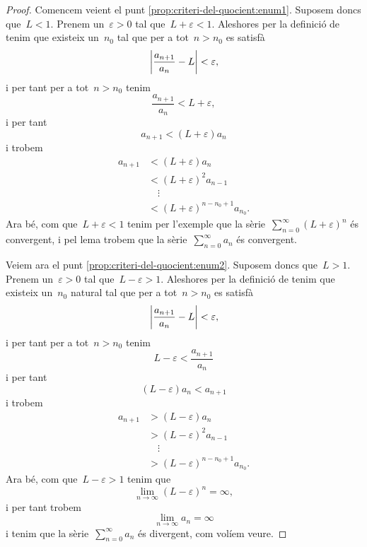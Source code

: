 \documentclass[../analisi-matematica.tex]{subfiles}
\begin{document}
    \begin{proof}
        Comencem veient el punt \eqref{prop:criteri-del-quocient:enum1}.
        Suposem doncs que~\(L<1\).
        Prenem un~\(\varepsilon>0\) tal que~\(L+\varepsilon<1\).
        Aleshores per la definició de  tenim que existeix un~\(n_{0}\) tal que per a tot~\(n>n_{0}\) es satisfà
        \[
            \abs{\frac{a_{n+1}}{a_{n}}-L}<\varepsilon,
        \]
        i per tant per a tot~\(n>n_{0}\) tenim
        \[
            \frac{a_{n+1}}{a_{n}}<L+\varepsilon,
        \]
        i per tant
        \[
            a_{n+1}<(L+\varepsilon)a_{n}
        \]
        i trobem
        \begin{align*}
            a_{n+1}&<(L+\varepsilon)a_{n}\\
            &<(L+\varepsilon)^{2}a_{n-1}\\
            &\quad\vdots\\
            &<(L+\varepsilon)^{n-n_{0}+1}a_{n_{0}}.
        \end{align*}
        Ara bé, com que~\(L+\varepsilon<1\) tenim per l'exemple  que la sèrie~\(\sum_{n=0}^{\infty}(L+\varepsilon)^{n}\) és convergent, i pel lema  trobem que la sèrie~\(\sum_{n=0}^{\infty}a_{n}\) és convergent.

        Veiem ara el punt \eqref{prop:criteri-del-quocient:enum2}.
        Suposem doncs que~\(L>1\).
        Prenem un~\(\varepsilon>0\) tal que~\(L-\varepsilon>1\).
        Aleshores per la definició de  tenim que existeix un~\(n_{0}\) natural tal que per a tot~\(n>n_{0}\) es satisfà
        \[
            \abs{\frac{a_{n+1}}{a_{n}}-L}<\varepsilon,
        \]
        i per tant per a tot~\(n>n_{0}\) tenim
        \[
            L-\varepsilon<\frac{a_{n+1}}{a_{n}}
        \]
        i per tant
        \[
            (L-\varepsilon)a_{n}<a_{n+1}
        \]
        i trobem
        \begin{align*}
            a_{n+1}&>(L-\varepsilon)a_{n}\\
            &>(L-\varepsilon)^{2}a_{n-1}\\
            &\quad\vdots\\
            &>(L-\varepsilon)^{n-n_{0}+1}a_{n_{0}}.
        \end{align*}
        Ara bé, com que~\(L-\varepsilon>1\) tenim que
        \[
            \lim_{n\to\infty}(L-\varepsilon)^{n}=\infty,
        \]
        i per tant trobem
        \[
            \lim_{n\to\infty}a_{n}=\infty
        \]
        i tenim que la sèrie~\(\sum_{n=0}^{\infty}a_{n}\) és divergent, com volíem veure.
    \end{proof}
\end{document}
